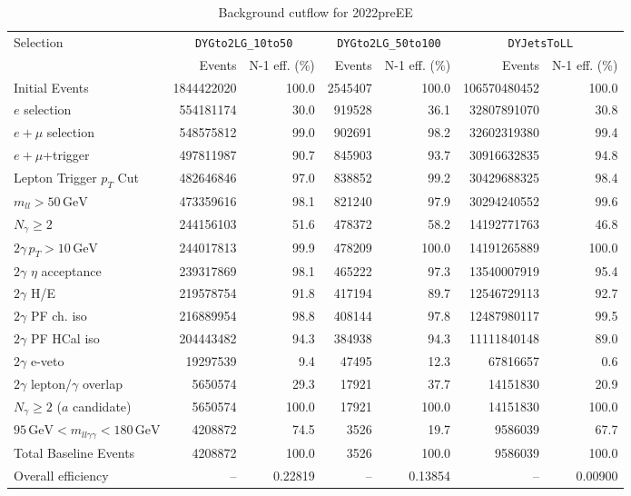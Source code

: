 \begin{table}[htbp]
\centering
\caption{Background cutflow for 2022preEE}
\label{tab:cutflow-bkg-mc-2022preee}
\footnotesize
\begin{tabular}{lrrrrrr}
\hline
Selection & \multicolumn{2}{c}{\texttt{DYGto2LG\_10to50}} & \multicolumn{2}{c}{\texttt{DYGto2LG\_50to100}} & \multicolumn{2}{c}{\texttt{DYJetsToLL}} \\
 & Events & N-1 eff. (\%) & Events & N-1 eff. (\%) & Events & N-1 eff. (\%) \\
\hline
Initial Events & 1844422020 & 100.0 & 2545407 & 100.0 & 106570480452 & 100.0 \\
$e$ selection & 554181174 & 30.0 & 919528 & 36.1 & 32807891070 & 30.8 \\
$e+\mu$ selection & 548575812 & 99.0 & 902691 & 98.2 & 32602319380 & 99.4 \\
$e+\mu$+trigger & 497811987 & 90.7 & 845903 & 93.7 & 30916632835 & 94.8 \\
Lepton Trigger $p_T$ Cut & 482646846 & 97.0 & 838852 & 99.2 & 30429688325 & 98.4 \\
$m_{ll} > 50\,\mathrm{GeV}$ & 473359616 & 98.1 & 821240 & 97.9 & 30294240552 & 99.6 \\
$N_{\gamma}\geq 2$ & 244156103 & 51.6 & 478372 & 58.2 & 14192771763 & 46.8 \\
$2\gamma\,p_T > 10\,\mathrm{GeV}$ & 244017813 & 99.9 & 478209 & 100.0 & 14191265889 & 100.0 \\
$2\gamma$ $\eta$ acceptance & 239317869 & 98.1 & 465222 & 97.3 & 13540007919 & 95.4 \\
$2\gamma$ H/E & 219578754 & 91.8 & 417194 & 89.7 & 12546729113 & 92.7 \\
$2\gamma$ PF ch. iso & 216889954 & 98.8 & 408144 & 97.8 & 12487980117 & 99.5 \\
$2\gamma$ PF HCal iso & 204443482 & 94.3 & 384938 & 94.3 & 11111840148 & 89.0 \\
$2\gamma$ e-veto & 19297539 & 9.4 & 47495 & 12.3 & 67816657 & 0.6 \\
$2\gamma$ lepton/$\gamma$ overlap & 5650574 & 29.3 & 17921 & 37.7 & 14151830 & 20.9 \\
$N_{\gamma}\geq 2$ ($a$ candidate) & 5650574 & 100.0 & 17921 & 100.0 & 14151830 & 100.0 \\
$95\,\mathrm{GeV} < m_{ll\gamma\gamma} < 180\,\mathrm{GeV}$ & 4208872 & 74.5 & 3526 & 19.7 & 9586039 & 67.7 \\
Total Baseline Events & 4208872 & 100.0 & 3526 & 100.0 & 9586039 & 100.0 \\
\hline
Overall efficiency & -- & 0.22819 & -- & 0.13854 & -- & 0.00900 \\
\hline
\end{tabular}
\end{table}

